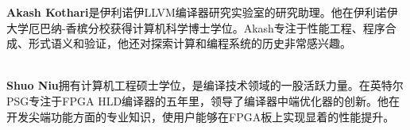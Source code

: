 \textbf{Akash Kothari}是伊利诺伊LLVM编译器研究实验室的研究助理。他在伊利诺伊大学厄巴纳-香槟分校获得计算机科学博士学位。Akash专注于性能工程、程序合成、形式语义和验证，他还对探索计算和编程系统的历史非常感兴趣。

\hspace*{\fill} \\

\textbf{Shuo Niu}拥有计算机工程硕士学位，是编译技术领域的一股活跃力量。在英特尔PSG专注于FPGA HLD编译器的五年里，领导了编译器中端优化器的创新。他在开发尖端功能方面的专业知识，使用户能够在FPGA板上实现显着的性能提升。
